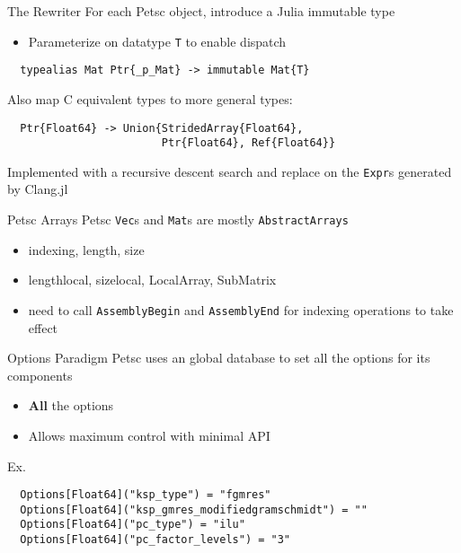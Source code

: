 \documentclass{beamer}
\begin{document}
\begin{frame}[fragile]{The Rewriter}
For each Petsc object, introduce a Julia immutable type
\begin{itemize}
  \item Parameterize on datatype \texttt{T} to enable dispatch
\end{itemize}
\begin{verbatim}
  typealias Mat Ptr{_p_Mat} -> immutable Mat{T}
\end{verbatim}
\hfill

Also map C equivalent types to more general types:
\begin{verbatim} 
  Ptr{Float64} -> Union{StridedArray{Float64},
                        Ptr{Float64}, Ref{Float64}}
\end{verbatim}
\hfill

Implemented with a recursive descent search and replace on the \texttt{Expr}s 
generated by Clang.jl

\end{frame}

\begin{frame}{Petsc Arrays}
Petsc \texttt{Vec}s and \texttt{Mat}s are mostly \texttt{AbstractArrays}
\begin{itemize}
  \item indexing, length, size
  \item lengthlocal, sizelocal, LocalArray, SubMatrix
  \item need to call \texttt{AssemblyBegin} and \texttt{AssemblyEnd} for indexing operations to take effect
\end{itemize}

\end{frame}

\begin{frame}[fragile]{Options Paradigm}
Petsc uses an global database to set all the options for its components
\begin{itemize}
  \item \textbf{All} the options
  \item Allows maximum control with minimal API
\end{itemize}
\hfill

Ex.
\begin{verbatim}
  Options[Float64]("ksp_type") = "fgmres"
  Options[Float64]("ksp_gmres_modifiedgramschmidt") = ""
  Options[Float64]("pc_type") = "ilu"
  Options[Float64]("pc_factor_levels") = "3"
\end{verbatim}

\end{frame}
\end{document}
